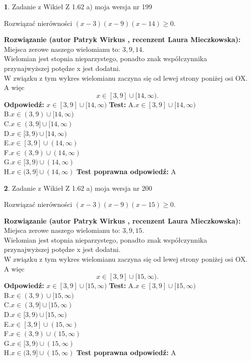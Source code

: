 \documentclass[12pt, a4paper]{article}
\theoremstyle{definition} %
\newtheorem{zad}{}
\newcommand{\zadStart}[1]{\begin{zad}#1\newline}
\newcommand{\zadStop}{\end{zad}}
\newcommand{\rozwStart}[2]{\noindent \textbf{Rozwiązanie (autor #1 , recenzent #2): }\newline}
\newcommand{\rozwStop}{\newline}
\newcommand{\odpStart}{\noindent \textbf{Odpowiedź:}\newline}
\newcommand{\odpStop}{\newline}
\newcommand{\testStart}{\noindent \textbf{Test:}\newline}
\newcommand{\testStop}{\newline}
\newcommand{\kluczStart}{\noindent \textbf{Test poprawna odpowiedź:}\newline}
\newcommand{\kluczStop}{\newline}
\begin{document}
\zadStart{Zadanie z Wikieł Z 1.62 a) moja wersja nr 199}

Rozwiązać nierówności $(x-3)(x-9)(x-14)\ge0$.
\zadStop
\rozwStart{Patryk Wirkus}{Laura Mieczkowska}
Miejsca zerowe naszego wielomianu to: $3, 9, 14$.\\
Wielomian jest stopnia nieparzystego, ponadto znak współczynnika przy\linebreak najwyższej potędze x jest dodatni.\\ W związku z tym wykres wielomianu zaczyna się od lewej strony poniżej osi OX. A więc $$x \in [3,9] \cup [14,\infty).$$
\rozwStop
\odpStart
$x \in [3,9] \cup [14,\infty)$
\odpStop
\testStart
A.$x \in [3,9] \cup [14,\infty)$\\
B.$x \in (3,9) \cup [14,\infty)$\\
C.$x \in (3,9] \cup [14,\infty)$\\
D.$x \in [3,9) \cup [14,\infty)$\\
E.$x \in [3,9] \cup (14,\infty)$\\
F.$x \in (3,9) \cup (14,\infty)$\\
G.$x \in [3,9) \cup (14,\infty)$\\
H.$x \in (3,9] \cup (14,\infty)$
\testStop
\kluczStart
A
\kluczStop



\zadStart{Zadanie z Wikieł Z 1.62 a) moja wersja nr 200}

Rozwiązać nierówności $(x-3)(x-9)(x-15)\ge0$.
\zadStop
\rozwStart{Patryk Wirkus}{Laura Mieczkowska}
Miejsca zerowe naszego wielomianu to: $3, 9, 15$.\\
Wielomian jest stopnia nieparzystego, ponadto znak współczynnika przy\linebreak najwyższej potędze x jest dodatni.\\ W związku z tym wykres wielomianu zaczyna się od lewej strony poniżej osi OX. A więc $$x \in [3,9] \cup [15,\infty).$$
\rozwStop
\odpStart
$x \in [3,9] \cup [15,\infty)$
\odpStop
\testStart
A.$x \in [3,9] \cup [15,\infty)$\\
B.$x \in (3,9) \cup [15,\infty)$\\
C.$x \in (3,9] \cup [15,\infty)$\\
D.$x \in [3,9) \cup [15,\infty)$\\
E.$x \in [3,9] \cup (15,\infty)$\\
F.$x \in (3,9) \cup (15,\infty)$\\
G.$x \in [3,9) \cup (15,\infty)$\\
H.$x \in (3,9] \cup (15,\infty)$
\testStop
\kluczStart
A
\kluczStop
\end{document}
